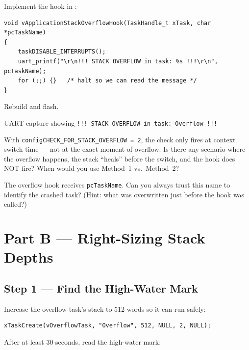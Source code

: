 \documentclass[11pt, a4paper]{article}
\begin{document}
Implement the hook in :

\begin{lstlisting}[style=cstyle]
void vApplicationStackOverflowHook(TaskHandle_t xTask, char *pcTaskName)
{
    taskDISABLE_INTERRUPTS();
    uart_printf("\r\n!!! STACK OVERFLOW in task: %s !!!\r\n", pcTaskName);
    for (;;) {}   /* halt so we can read the message */
}
\end{lstlisting}

Rebuild and flash.

\begin{checkpointbox}[~A2]
  UART capture showing \texttt{!!! STACK OVERFLOW in task: Overflow !!!}
\end{checkpointbox}

\begin{questionbox}[~A1]
  With \texttt{configCHECK\_FOR\_STACK\_OVERFLOW = 2}, the check only fires at context
  switch time --- not at the exact moment of overflow. Is there any scenario where the
  overflow happens, the stack ``heals'' before the switch, and the hook does NOT fire?
  When would you use Method~1 vs.\ Method~2?
\end{questionbox}

\begin{questionbox}[~A2]
  The overflow hook receives \texttt{pcTaskName}. Can you always trust this name to
  identify the crashed task? (Hint: what was overwritten just before the hook was called?)
\end{questionbox}

\section{Part B --- Right-Sizing Stack Depths}

\subsection{Step 1 --- Find the High-Water Mark}

Increase the overflow task's stack to 512 words so it can run safely:

\begin{lstlisting}[style=cstyle]
xTaskCreate(vOverflowTask, "Overflow", 512, NULL, 2, NULL);
\end{lstlisting}

After at least 30 seconds, read the high-water mark:
\end{document}
